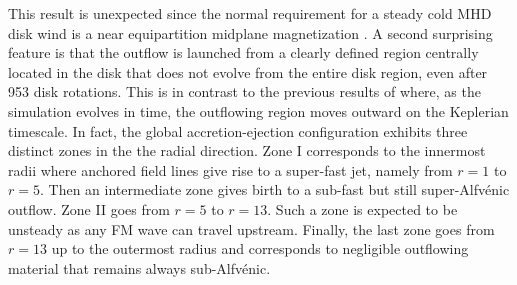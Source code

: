 \documentclass{aa}
\begin{document}
This result is unexpected since the normal requirement for a steady cold MHD disk wind is a near equipartition midplane magnetization \citep{1995A&A...295..807F}.  A second surprising feature is that
the outflow is launched from a clearly defined region centrally located in the disk that does not evolve from the entire disk region, even after 953 disk rotations.  This is in contrast to the
previous results of \citet{2007A&A...469..811Z} where, as the simulation evolves in time, the outflowing region moves outward on the Keplerian timescale.  In fact, the global accretion-ejection
configuration exhibits three distinct zones in the the radial direction. Zone I corresponds to the innermost radii where anchored field lines give rise to a super-fast jet, namely from $r=1$ to $r= 5$. 
Then an intermediate zone gives birth to a sub-fast but still super-Alfv\'enic outflow. Zone II goes from $r= 5$ to $r= 13$. Such a zone is expected to be unsteady as any FM wave can travel upstream. 
Finally, the last zone goes from $r=13$ up to the outermost radius and corresponds to negligible outflowing material that remains always sub-Alfv\'enic.
\end{document}

